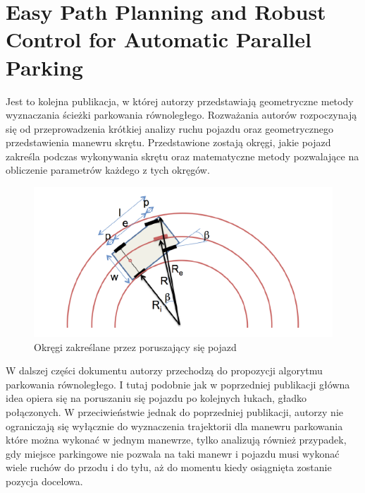 \documentclass[a4paper,11pt,twoside]{report}
\theoremstyle{definition}
\begin{document}
\section{Easy Path Planning and Robust Control for Automatic Parallel Parking}

Jest to kolejna publikacja, w której autorzy przedstawiają geometryczne metody wyznaczania ścieżki parkowania równoległego. Rozważania autorów rozpoczynają się od przeprowadzenia krótkiej analizy ruchu pojazdu oraz geometrycznego przedstawienia manewru skrętu. Przedstawione zostają okręgi, jakie pojazd zakreśla podczas wykonywania skrętu oraz matematyczne metody pozwalające na obliczenie parametrów każdego z tych okręgów.

\begin{figure}[h!]
\centering
\includegraphics[scale=0.6]{easyPathPlanning1}
\caption[Okręgi zakreślane przez poruszający się pojazd]{Okręgi zakreślane przez poruszający się pojazd}
\end{figure}

W dalszej części dokumentu autorzy przechodzą do propozycji algorytmu parkowania równoległego. I tutaj podobnie jak w poprzedniej publikacji główna idea opiera się na poruszaniu się pojazdu po kolejnych łukach, gładko połączonych. W przeciwieństwie jednak do poprzedniej publikacji, autorzy nie ograniczają się wyłącznie do wyznaczenia trajektorii dla manewru parkowania które można wykonać w jednym manewrze, tylko analizują również przypadek, gdy miejsce parkingowe nie pozwala na taki manewr i pojazdu musi wykonać wiele ruchów do przodu i do tyłu, aż do momentu kiedy osiągnięta zostanie pozycja docelowa. 
\end{document}
